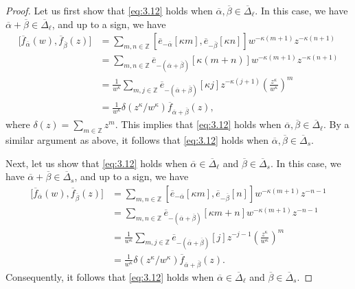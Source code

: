 \documentclass[10pt,a4paper]{amsart}
\numberwithin{equation}{section}
\begin{document}
\begin{proof}
Let us first show that \eqref{eq:3.12} holds when $\overline{\alpha},\overline{\beta}\in\overline{\Delta}_{\ell}$. In this case, we have $\overline{\alpha}+\overline{\beta}\in \overline{\Delta}_{\ell}$, and up to a sign, we have
\begin{align*}
\bigl[\overline{f}_{\overline{\alpha}}(w), \overline{f}_{\overline{\beta}}(z)\bigr]
&=\sum_{m,n\in\mathbb{Z}}[\overline{e}_{-\overline{\alpha}}[\kappa m],\overline{e}_{-\overline{\beta}}[\kappa n]]w^{-\kappa(m+1)}z^{-\kappa(n+1)}\\
&=\sum_{m,n\in\mathbb{Z}}\overline{e}_{-\left( \overline{\alpha}+\overline{\beta}\right)}[\kappa(m+n)]w^{-\kappa(m+1)}z^{-\kappa (n+1)}\\
&=\frac{1}{w^{\kappa}}\sum_{m,j\in\mathbb{Z}}\overline{e}_{-\left(\overline{\alpha}+\overline{\beta}\right)}[\kappa j]z^{-\kappa (j+1)}\left(\frac{z^{\kappa}}{w^{\kappa}}\right)^m\\
&=\frac{1}{w^{\kappa}}\delta(z^{\kappa}/w^{\kappa}) \overline{f}_{\overline{\alpha}+ \overline{\beta}}(z),
\end{align*}
where $\delta(z)=\sum_{m\in\mathbb{Z}}z^m$. This implies that \eqref{eq:3.12} holds when $\overline{\alpha}, \overline{\beta}\in\overline{\Delta}_{\ell}$. By a similar argument as above, it follows that \eqref{eq:3.12} holds when $\overline{\alpha},\overline{\beta}\in \overline{\Delta}_s$.

Next, let us show that \eqref{eq:3.12} holds when $\overline{\alpha}\in\overline{\Delta}_{\ell}$ and $\overline{\beta}\in\overline{\Delta}_s$. In this case, we have $\overline{\alpha}+\overline{\beta}\in \overline{\Delta}_s$, and up to a sign, we have
\begin{align*}
\bigl[\overline{f}_{\overline{\alpha}}(w), \overline{f}_{\overline{\beta}}(z)\bigr]
&=\sum_{m,n\in\mathbb{Z}}[\overline{e}_{-\overline{\alpha}}[\kappa m],\overline{e}_{-\overline{\beta}}[n]]w^{-\kappa(m+1)}z^{-n-1}\\
&=\sum_{m,n\in\mathbb{Z}}\overline{e}_{-\left( \overline{\alpha}+\overline{\beta}\right)}[\kappa m+n]w^{-\kappa(m+1)}z^{-n-1}\\
&=\frac{1}{w^{\kappa}}\sum_{m,j\in\mathbb{Z}}\overline{e}_{-\left(\overline{\alpha}+\overline{\beta}\right)}[j]z^{-j-1}\left(\frac{z^{\kappa}}{w^{\kappa}}\right)^m\\
&=\frac{1}{w^{\kappa}}\delta(z^{\kappa}/w^{\kappa}) \overline{f}_{\overline{\alpha}+ \overline{\beta}}(z).
\end{align*}
Consequently, it follows that \eqref{eq:3.12} holds when $\overline{\alpha}\in\overline{\Delta}_{\ell}$ and $\overline{\beta}\in\overline{\Delta}_s$.


\end{proof}
\end{document}
